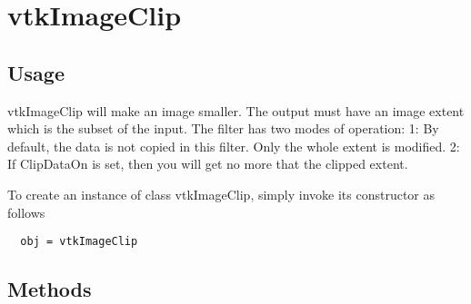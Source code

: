 \section{vtkImageClip}

\subsection{Usage}

 vtkImageClip  will make an image smaller.  The output must have
 an image extent which is the subset of the input.  The filter has two 
 modes of operation: 
 1: By default, the data is not copied in this filter. 
 Only the whole extent is modified.  
 2: If ClipDataOn is set, then you will get no more that the clipped
 extent.

To create an instance of class vtkImageClip, simply
invoke its constructor as follows
\begin{verbatim}
  obj = vtkImageClip
\end{verbatim}
\subsection{Methods}

